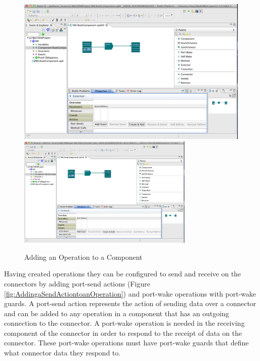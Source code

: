  \begin{figure}[!htbp]
  \centering
  \ifplastex
  \includegraphics[width=768]{figures/image6.png}
  \else
  \includegraphics[width=0.75\textwidth]{figures/image6.png}
  \fi
  \caption{Adding an Operation to a Component}
  \label{fig:Adding an Operation to a Component}
\end{figure}


Having created operations they can be configured to send and receive on the connectors by adding port-send actions (Figure \ref{fig:AddingaSendActiontoanOperation}) and port-wake operations with port-wake guards. A port-send action represents the action of sending data over a connector and can be added to any operation in a component that has an outgoing connection to the connector. A port-wake operation is needed in the receiving component of the connector in order to respond to the receipt of data on the connector. These port-wake operations must have port-wake guards that define what connector data they respond to. 


